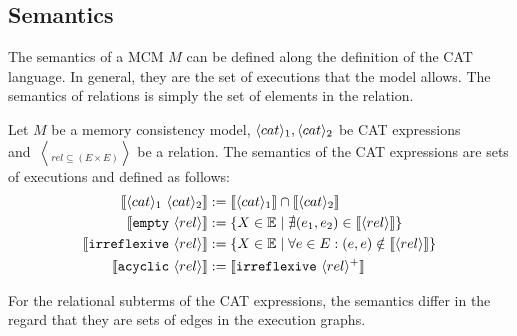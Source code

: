 \documentclass[a4paper,twoside,12pt, english]{article}
\begin{document}
\subsection{Semantics} \label{sec:semantics}
The semantics of a MCM $M$ can be defined along the definition of the CAT language. In general, they are the set of executions that the model allows. The semantics of relations is simply the set of elements in the relation.
\begin{definition} \label{def:catsem}
Let $M$ be a memory consistency model, $\langle cat \rangle_1,\langle cat \rangle_2$ be CAT expressions\\ and~$\bangle{rel} \subseteq (E\times E)$ be a relation. The semantics of the CAT expressions are sets of executions and defined as follows:
\begin{align*}
\llbracket \langle cat \rangle_1~ \langle cat \rangle_2 \rrbracket & := \llbracket \langle cat \rangle_1 \rrbracket \cap \llbracket \langle cat \rangle_2 \rrbracket \\
\llbracket \texttt{empty}~ \langle rel \rangle \rrbracket &:= \{X \in \mathbb{E} \mid \nexists (e_1,e_2) \in \llbracket \langle rel \rangle \rrbracket\} \\
\llbracket \texttt{irreflexive}~ \langle rel \rangle \rrbracket &:= \{X \in \mathbb{E} \mid \forall e \in E: (e,e) \notin \llbracket \langle rel \rangle \rrbracket \} \\
\llbracket \texttt{acyclic}~ \langle rel \rangle \rrbracket &:= \llbracket \texttt{irreflexive}~ \langle rel \rangle^+ \rrbracket
\end{align*} 
\end{definition}
For the relational subterms of the CAT expressions, the semantics differ in the regard that they are sets of edges in the execution graphs.
\end{document}
